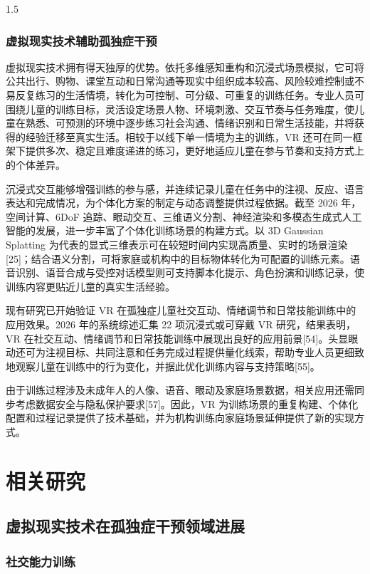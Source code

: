 \documentclass[zihao=-4]{ctexart}
\begin{document}
\begin{spacing}{1.5}
\subsubsection{虚拟现实技术辅助孤独症干预}

虚拟现实技术拥有得天独厚的优势。依托多维感知重构和沉浸式场景模拟，它可将公共出行、购物、课堂互动和日常沟通等现实中组织成本较高、风险较难控制或不易反复练习的生活情境，转化为可控制、可分级、可重复的训练任务。专业人员可围绕儿童的训练目标，灵活设定场景人物、环境刺激、交互节奏与任务难度，使儿童在熟悉、可预测的环境中逐步练习社会沟通、情绪识别和日常生活技能，并将获得的经验迁移至真实生活。相较于以线下单一情境为主的训练，VR 还可在同一框架下提供多次、稳定且难度递进的练习，更好地适应儿童在参与节奏和支持方式上的个体差异。

沉浸式交互能够增强训练的参与感，并连续记录儿童在任务中的注视、反应、语言表达和完成情况，为个体化方案的制定与动态调整提供过程依据。截至 2026 年，空间计算、6DoF 追踪、眼动交互、三维语义分割、神经渲染和多模态生成式人工智能的发展，进一步丰富了个体化训练场景的构建方式。以 3D Gaussian Splatting 为代表的显式三维表示可在较短时间内实现高质量、实时的场景渲染[25]；结合语义分割，可将家庭或机构中的目标物体转化为可配置的训练元素。语音识别、语音合成与受控对话模型则可支持脚本化提示、角色扮演和训练记录，使训练内容更贴近儿童的真实生活经验。

现有研究已开始验证 VR 在孤独症儿童社交互动、情绪调节和日常技能训练中的应用效果。2026 年的系统综述汇集 22 项沉浸式或可穿戴 VR 研究，结果表明，VR 在社交互动、情绪调节和日常技能训练中展现出良好的应用前景[54]。头显眼动还可为注视目标、共同注意和任务完成过程提供量化线索，帮助专业人员更细致地观察儿童在训练中的行为变化，并据此优化训练内容与支持策略[55]。

由于训练过程涉及未成年人的人像、语音、眼动及家庭场景数据，相关应用还需同步考虑数据安全与隐私保护要求[57]。因此，VR 为训练场景的重复构建、个体化配置和过程记录提供了技术基础，并为机构训练向家庭场景延伸提供了新的实现方式。

\section{相关研究}

\subsection{虚拟现实技术在孤独症干预领域进展}

\subsubsection{社交能力训练}


\end{spacing}
\end{document}
